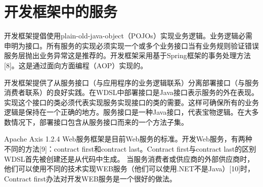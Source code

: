 
\chapter{开发框架中的服务}
开发框架提倡使用plain-old-java-object（POJOs）实现业务逻辑。业务逻辑必需申明为接口。所有服务的实现必须实现一个或多个业务接口当有业务规则验证错误服务层抛出业务异常这是推荐的。开发框架采用基于Spring框架的事务处理方法[8]。这是通过面向方面编程（AOP）实现的。

开发框架提供了从服务接口（与应用程序的业务逻辑联系）分离部署接口（与服务消费者联系）的良好实践。在WDSL中部署接口是Java接口表示服务的外在表现。实现这个接口的类必须代表实现服务实现接口的类的需要。这样可确保所有的业务逻辑是保持在一个正确的地方。服务接口是一种Java接口，代表宝物逻辑。在大多数情况下，部署接口包含从服务接口而来的一个方法子集。

Apache Axis 1.2.4 Web服务框架是目前Web服务的标准。开发Web服务，有两种不同的方法[9]：contract first和contract last。Contract first与contract last的区别WDSL首先被创建还是从代码中生成。
当服务消费者或供应商的外部供应商时，他们可以使用不同的技术实现WEB服务（他们可以使用.NET不是Java）[10]时，Contract first办法对开发WEB服务是一个很好的做法。
